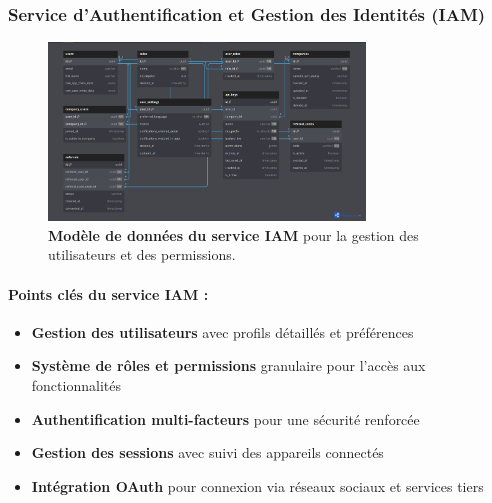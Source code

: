 \subsubsection{Service d'Authentification et Gestion des Identités (IAM)}
\begin{figure}[H]
  \centering
  \includegraphics[width=0.75\textwidth,keepaspectratio]{week_1_img/services_db_screanshots/Screenshot 2025-06-06 at 15-08-36 IAM_Service.pdf.png}
  \caption{\textbf{Modèle de données du service IAM} pour la gestion des utilisateurs et des permissions.}
  \label{fig:iam_service}
\end{figure}

\small
\paragraph{Points clés du service IAM :}
\begin{itemize}[leftmargin=*,noitemsep,topsep=0pt]
  \item \textbf{Gestion des utilisateurs} avec profils détaillés et préférences
  \item \textbf{Système de rôles et permissions} granulaire pour l'accès aux fonctionnalités
  \item \textbf{Authentification multi-facteurs} pour une sécurité renforcée
  \item \textbf{Gestion des sessions} avec suivi des appareils connectés
  \item \textbf{Intégration OAuth} pour connexion via réseaux sociaux et services tiers
\end{itemize}
\normalsize

